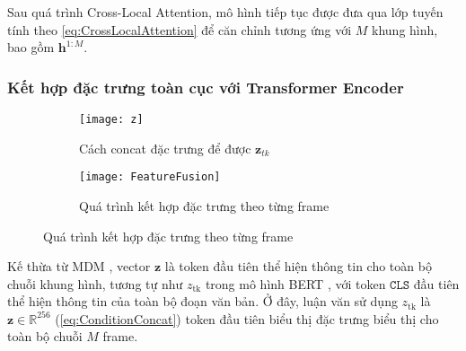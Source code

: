 Sau quá trình Cross-Local Attention, mô hình tiếp tục được đưa qua lớp tuyến tính theo \autoref{eq:CrossLocalAttention} để căn chỉnh tương ứng với $M$ khung hình, bao gồm $\mathbf{h}^{1:M}$.


\subsubsection{Kết hợp đặc trưng toàn cục với Transformer Encoder}


%



\begin{figure}[H]
	\centering
	\begin{subfigure}{0.42\textwidth}
		\centering
		\texttt{[image: z]}
		\caption{Cách concat đặc trưng để được $\mathbf{z}_{tk}$}
		\label{fig:FeatureFusion}
	\end{subfigure}
	\hfill
	\begin{subfigure}{0.55\textwidth}
		\centering
		\texttt{[image: FeatureFusion]}
		\caption{Quá trình kết hợp đặc trưng theo từng frame}
		\label{fig:ZToken}
	\end{subfigure}
\end{figure}



Kế thừa từ MDM \cite{tevet2022human}, vector $\mathbf{z}$ là token đầu tiên thể hiện thông tin cho toàn bộ chuỗi khung hình, tương tự như  $z_{\text{tk}}$ trong mô hình BERT \cite{devlin2019bertpretrainingdeepbidirectional}, với token $\texttt{CLS}$ đầu tiên thể hiện thông tin của toàn bộ đoạn văn bản.
Ở đây, luận văn sử dụng $z_{\text{tk}}$ là $\mathbf{z} \in \mathbb{R}^{256}$ (\autoref{eq:ConditionConcat}) token đầu tiên biểu thị đặc trưng biểu thị cho toàn bộ chuỗi $M$ frame.

